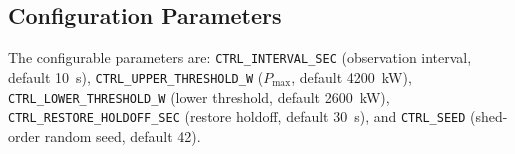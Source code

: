 \subsection{Configuration Parameters}
\label{app:controller-config}

The configurable parameters are:
\texttt{CTRL\_INTERVAL\_SEC} (observation interval, default 10~s),
\texttt{CTRL\_UPPER\_THRESHOLD\_W} ($P_\text{max}$, default 4200~kW),
\texttt{CTRL\_LOWER\_THRESHOLD\_W} (lower threshold, default 2600~kW),
\texttt{CTRL\_RESTORE\_HOLDOFF\_SEC} (restore holdoff, default 30~s),
and \texttt{CTRL\_SEED} (shed-order random seed, default 42).

